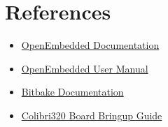 \chapter{\label{chap:app-references}References}

\begin{itemize}
\item \href{http://wiki.openembedded.org/index.php/Documentation}{OpenEmbedded Documentation}
\item \href{http://docs.openembedded.org/usermanual/usermanual.pdf}{OpenEmbedded User Manual}
\item \href{http://docs.openembedded.org/bitbake/html/}{Bitbake Documentation}

\item \href{https://www.cvg.de/people/ensc/pxa320/BoardBringUp.html}{Colibri320 Board Bringup Guide}
\end{itemize}

